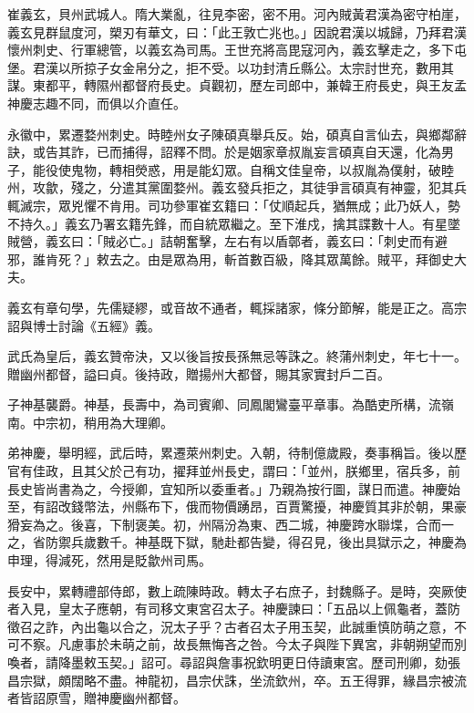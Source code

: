 
\begin{pinyinscope}

 崔義玄，貝州武城人。隋大業亂，往見李密，密不用。河內賊黃君漢為密守柏崖，義玄見群鼠度河，槊刃有華文，曰：「此王敦亡兆也。」因說君漢以城歸，乃拜君漢懷州刺史、行軍總管，以義玄為司馬。王世充將高毘寇河內，義玄擊走之，多下屯堡。君漢以所掠子女金帛分之，拒不受。以功封清丘縣公。太宗討世充，數用其謀。東都平，轉隰州都督府長史。貞觀初，歷左司郎中，兼韓王府長史，與王友孟神慶志趣不同，而俱以介直任。



 永徽中，累遷婺州刺史。時睦州女子陳碩真舉兵反。始，碩真自言仙去，與鄉鄰辭訣，或告其詐，已而捕得，詔釋不問。於是姻家章叔胤妄言碩真自天還，化為男子，能役使鬼物，轉相熒惑，用是能幻眾。自稱文佳皇帝，以叔胤為僕射，破睦州，攻歙，殘之，分遣其黨圍婺州。義玄發兵拒之，其徒爭言碩真有神靈，犯其兵輒滅宗，眾兇懼不肯用。司功參軍崔玄籍曰：「仗順起兵，猶無成；此乃妖人，勢不持久。」義玄乃署玄籍先鋒，而自統眾繼之。至下淮戍，擒其諜數十人。有星墜賊營，義玄曰：「賊必亡。」詰朝奮擊，左右有以盾鄣者，義玄曰：「刺史而有避邪，誰肯死？」敕去之。由是眾為用，斬首數百級，降其眾萬餘。賊平，拜御史大夫。



 義玄有章句學，先儒疑繆，或音故不通者，輒採諸家，條分節解，能是正之。高宗詔與博士討論《五經》義。



 武氏為皇后，義玄贊帝決，又以後旨按長孫無忌等誅之。終蒲州刺史，年七十一。贈幽州都督，謚曰貞。後持政，贈揚州大都督，賜其家實封戶二百。



 子神基襲爵。神基，長壽中，為司賓卿、同鳳閣鸞臺平章事。為酷吏所構，流嶺南。中宗初，稍用為大理卿。



 弟神慶，舉明經，武后時，累遷萊州刺史。入朝，待制億歲殿，奏事稱旨。後以歷官有佳政，且其父於己有功，擢拜並州長史，謂曰：「並州，朕鄉里，宿兵多，前長史皆尚書為之，今授卿，宜知所以委重者。」乃親為按行圖，謀日而遣。神慶始至，有詔改錢幣法，州縣布下，俄而物價踴昂，百賈驚擾，神慶質其非於朝，果豪猾妄為之。後喜，下制褒美。初，州隔汾為東、西二城，神慶跨水聯堞，合而一之，省防禦兵歲數千。神基既下獄，馳赴都告變，得召見，後出具獄示之，神慶為申理，得減死，然用是貶歙州司馬。



 長安中，累轉禮部侍郎，數上疏陳時政。轉太子右庶子，封魏縣子。是時，突厥使者入見，皇太子應朝，有司移文東宮召太子。神慶諫曰：「五品以上佩龜者，蓋防徵召之詐，內出龜以合之，況太子乎？古者召太子用玉契，此誠重慎防萌之意，不可不察。凡慮事於未萌之前，故長無悔吝之咎。今太子與陛下異宮，非朝朔望而別喚者，請降墨敕玉契。」詔可。尋詔與詹事祝欽明更日侍讀東宮。歷司刑卿，劾張昌宗獄，頗闊略不盡。神龍初，昌宗伏誅，坐流欽州，卒。五王得罪，緣昌宗被流者皆詔原雪，贈神慶幽州都督。




\end{pinyinscope}

